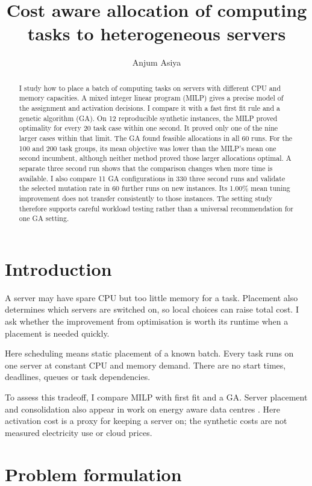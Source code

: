 \documentclass[10pt,a4paper]{article}
\title{Cost aware allocation of computing tasks to heterogeneous servers}
\author{Anjum Asiya}
\date{}
\begin{document}
\maketitle

\begin{abstract}
I study how to place a batch of computing tasks on servers with different CPU and
memory capacities. A mixed integer linear program (MILP) gives a precise model of
the assignment and activation decisions. I compare it with a fast first fit rule
and a genetic algorithm (GA). On 12 reproducible synthetic instances, the MILP
proved optimality for every 20 task case within one second. It proved only one of
the nine larger cases within that limit. The GA found feasible allocations in all
60 runs. For the 100 and 200 task groups, its mean objective was lower than the
MILP's mean one second incumbent, although neither method proved those larger
allocations optimal. A separate three second run shows that the comparison
changes when more time is available. I also compare 11 GA configurations in
330 three second runs and validate the selected mutation rate in 60 further
runs on new instances. Its 1.00\% mean tuning improvement does not transfer
consistently to those instances. The setting study therefore supports careful
workload testing rather than a universal recommendation for one GA setting.
\end{abstract}

\section{Introduction}

A server may have spare CPU but too little memory for a task. Placement also
determines which servers are switched on, so local choices can raise total cost.
I ask whether the improvement from optimisation is worth its runtime when a
placement is needed quickly.

Here scheduling means static placement of a known batch. Every task runs on one
server at constant CPU and memory demand. There are no start times, deadlines,
queues or task dependencies.

To assess this tradeoff, I compare MILP with first fit and a GA.
Server placement and consolidation also appear in work on energy aware data
centres \cite{beloglazov2012}. Here activation cost is a proxy for keeping a
server on; the synthetic costs are not measured electricity use or cloud prices.

\section{Problem formulation}
\end{document}
